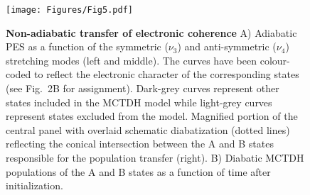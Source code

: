 \documentclass[12pt]{article}
\begin{document}
\begin{figure}
    \centering
    \texttt{[image: Figures/Fig5.pdf]}
    \caption{
    \textbf{Non-adiabatic transfer of electronic coherence} A) Adiabatic PES as a function of the symmetric ($\nu_3$) and anti-symmetric ($\nu_4$) stretching modes (left and middle). The curves have been colour-coded to reflect the electronic character of the corresponding states (see Fig.~2B for assignment). Dark-grey curves represent other states included in the MCTDH model while light-grey curves represent states excluded from the model. Magnified portion of the central panel with overlaid schematic diabatization (dotted lines) reflecting the conical intersection between the A and B states responsible for the population transfer (right). B) Diabatic MCTDH populations of the A and B states as a function of time after initialization.
    }
\end{figure}
%



\end{document}
